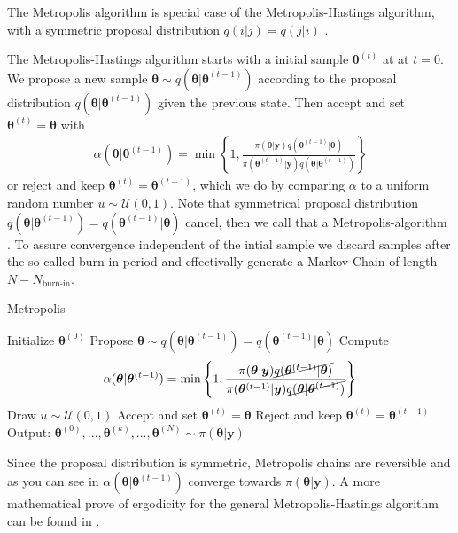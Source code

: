 The Metropolis algorithm is special case of the Metropolis-Hastings algorithm, with a symmetric proposal distribution $q(i|j) =q(j|i) $ \cite{}.

The Metropolis-Hastings algorithm starts with a initial sample $\bm{\theta}^{(t)}$ at  at $t=0$.
We propose a new sample $\bm{\theta}\sim q(\bm{\theta} | \bm{\theta}^{(t-1)})$ according to the proposal distribution $q(\bm{\theta} | \bm{\theta}^{(t-1)})$ given the previous state.
Then accept and set $ \bm{\theta}^{(t)} = \bm{\theta}$ with
\begin{align}
\alpha(\bm{\theta} | \bm{\theta}^{(t-1)}) = \min \left\{ 1, \frac{\pi(\bm{\theta}  | \bm{y}) q(\bm{\theta}^{(t-1)} | \bm{\theta})  }{\pi(\bm{\theta}^{(t-1)}| \bm{y}) q(\bm{\theta} | \bm{\theta}^{(t-1)}) } \right\}
\end{align}
or reject and keep $\bm{\theta}^{(t)} = \bm{\theta}^{(t-1)}$, which we do by comparing $\alpha$ to a uniform random number $u \sim \mathcal{U}(0,1)$.
Note that symmetrical proposal distribution $q(\bm{\theta} | \bm{\theta}^{(t-1)}) = q(\bm{\theta}^{(t-1)} | \bm{\theta}) $ cancel, then we call that a Metropolis-algorithm \cite{}.
To assure convergence independent of the intial sample we discard samples after the so-called burn-in period and effectivally generate a Markov-Chain of length $N - N_{\text{burn-in}}$.

\begin{algorithm}
	\caption{Metropolis}
	\begin{algorithmic}[1]
		\STATE Initialize \( \bm{\theta}^{(0)} \)
		\STATE Propose \( \bm{\theta} \sim q(\bm{\theta} | \bm{\theta}^{(t-1)}) = q(\bm{\theta}^{(t-1)} | \bm{\theta}) \)
		\STATE Compute
			\[ \alpha(\bm{\theta} | \bm{\theta}^{(t-1)}) = \min \left\{ 1, \frac{\pi(\bm{\theta}  | \bm{y}) \cancel{q(\bm{\theta}^{(t-1)} | \bm{\theta}) } }{\pi(\bm{\theta}^{(t-1)}| \bm{y}) \cancel{q(\bm{\theta} | \bm{\theta}^{(t-1)})} } \right\} \]
		\STATE Draw $u \sim \mathcal{U}(0,1)$
		\STATE Accept and set \( \bm{\theta}^{(t)} = \bm{\theta} \)
		\ELSE  
		\STATE Reject and keep \(\bm{\theta}^{(t)} = \bm{\theta}^{(t-1)} \)
		\ENDIF
		\ENDFOR
		\STATE Output: $ \bm{\theta}^{(0)}, \dots,  \bm{\theta}^{(k)} , \dots,   \bm{\theta}^{(N)} \sim \pi(\bm{\theta}| \bm{y}) $
	\end{algorithmic}
\end{algorithm}


Since the proposal distribution is symmetric, Metropolis chains are reversible and as you can see in $\alpha(\bm{\theta} | \bm{\theta}^{(t-1)})$ converge towards $\pi(\bm{\theta}| \bm{y})$.
A more mathematical prove of ergodicity for the general Metropolis-Hastings algorithm can be found in \cite{}.

